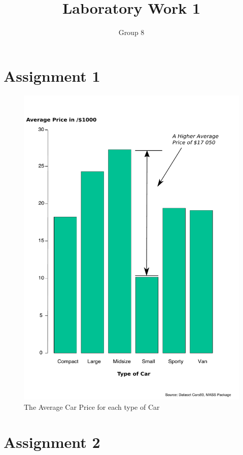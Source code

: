 \documentclass[11pt]{article}
\begin{document}
\author{Group 8}
\title{Laboratory Work 1}
\maketitle

\section{Assignment 1}

\begin{figure}[H]
  \centering
   \includegraphics[scale=0.4]{Assignment_1.pdf}
   \caption{The Average Car Price for each type of Car}
\end{figure}


\section{Assignment 2}
\end{document}
